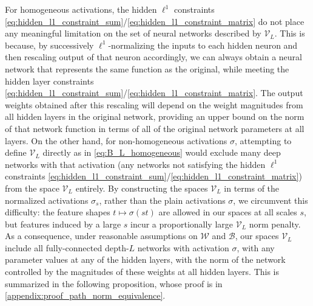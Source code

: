 \documentclass{article}
\def\cB{{\mathcal{B}}}
\def\cV{{\mathcal{V}}}
\def\cW{{\mathcal{W}}}
\begin{document}
For homogeneous activations, the hidden $\ell^1$ constraints \eqref{eq:hidden_l1_constraint_sum}/\eqref{eq:hidden_l1_constraint_matrix} do not place any meaningful limitation on the set of neural networks described by $\cV_L$. This is because, by successively $\ell^1$-normalizing the inputs to each hidden neuron and then rescaling output of that neuron accordingly, we can always obtain a neural network that represents the same function as the original, while meeting the hidden layer constraints \eqref{eq:hidden_l1_constraint_sum}/\eqref{eq:hidden_l1_constraint_matrix}. The output weights obtained after this rescaling will depend on the weight magnitudes from all hidden layers in the original network, providing an upper bound on the norm of that network function in terms of all of the original network parameters at all layers. On the other hand, for non-homogeneous activations $\sigma$, attempting to define $\cV_L$ directly as in \eqref{eq:B_L_homogeneous} would exclude many deep networks with that activation (any networks not satisfying the hidden $\ell^1$ constraints \eqref{eq:hidden_l1_constraint_sum}/\eqref{eq:hidden_l1_constraint_matrix}) from the space $\cV_L$ entirely. By constructing the spaces $\cV_L$ in terms of the normalized activations $\sigma_s$, rather than the plain activations $\sigma$, we circumvent this difficulty: the feature shapes $t \mapsto \sigma(st)$ are allowed in our spaces at all scales $s$, but features induced by a large $s$ incur a proportionally large $\cV_L$ norm penalty. As a consequence, under reasonable assumptions on $\cW$ and $\cB$, our spaces $\cV_L$ include all fully-connected depth-$L$ networks with activation $\sigma$, with any parameter values at any of the hidden layers, with the norm of the network controlled by the magnitudes of these weights at all hidden layers. This is summarized in the following proposition, whose proof is in \cref{appendix:proof_path_norm_equivalence}. 
\end{document}
